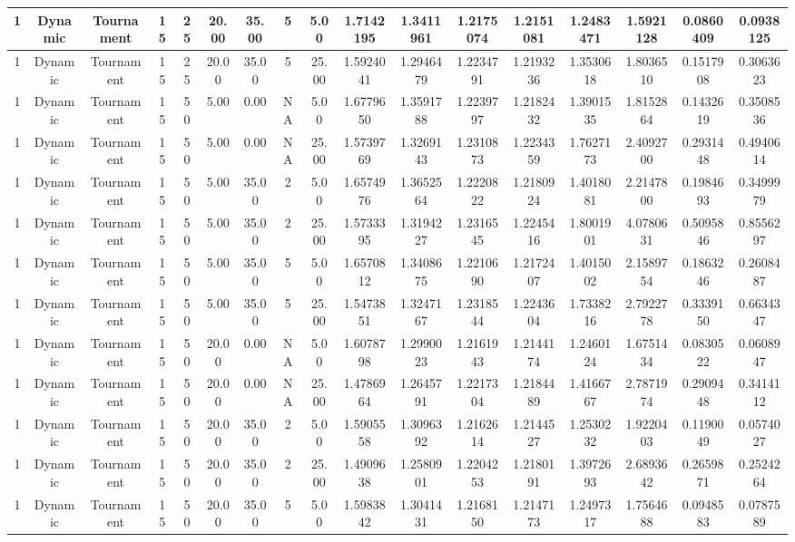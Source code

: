 \begin{longtable}{ | c | c | c | c | c | c | c | c | c | c | c | c | c | c | c | c | c | }
	\hline
	1	&	Dynamic	&	Tournament	&	15	&	25	&	20.00	&	35.00	&	5	&	5.00	&	1.7142195	&	1.3411961	&	1.2175074	&	1.2151081	&	1.2483471	&	1.5921128	&	0.0860409	&	0.0938125 \\
	\hline
	1	&	Dynamic	&	Tournament	&	15	&	25	&	20.00	&	35.00	&	5	&	25.00	&	1.5924041	&	1.2946479	&	1.2234791	&	1.2193236	&	1.3530618	&	1.8036510	&	0.1517908	&	0.3063623 \\
	\hline
	1	&	Dynamic	&	Tournament	&	15	&	50	&	5.00	&	0.00	&	NA	&	5.00	&	1.6779650	&	1.3591788	&	1.2239797	&	1.2182432	&	1.3901535	&	1.8152864	&	0.1432619	&	0.3508536 \\
	\hline
	1	&	Dynamic	&	Tournament	&	15	&	50	&	5.00	&	0.00	&	NA	&	25.00	&	1.5739769	&	1.3269143	&	1.2310873	&	1.2234359	&	1.7627173	&	2.4092700	&	0.2931448	&	0.4940614 \\
	\hline
	1	&	Dynamic	&	Tournament	&	15	&	50	&	5.00	&	35.00	&	2	&	5.00	&	1.6574976	&	1.3652564	&	1.2220822	&	1.2180924	&	1.4018081	&	2.2147800	&	0.1984693	&	0.3499979 \\
	\hline
	1	&	Dynamic	&	Tournament	&	15	&	50	&	5.00	&	35.00	&	2	&	25.00	&	1.5733395	&	1.3194227	&	1.2316545	&	1.2245416	&	1.8001901	&	4.0780631	&	0.5095846	&	0.8556297 \\
	\hline
	1	&	Dynamic	&	Tournament	&	15	&	50	&	5.00	&	35.00	&	5	&	5.00	&	1.6570812	&	1.3408675	&	1.2210690	&	1.2172407	&	1.4015002	&	2.1589754	&	0.1863246	&	0.2608487 \\
	\hline
	1	&	Dynamic	&	Tournament	&	15	&	50	&	5.00	&	35.00	&	5	&	25.00	&	1.5473851	&	1.3247167	&	1.2318544	&	1.2243604	&	1.7338216	&	2.7922778	&	0.3339150	&	0.6634347 \\
	\hline
	1	&	Dynamic	&	Tournament	&	15	&	50	&	20.00	&	0.00	&	NA	&	5.00	&	1.6078798	&	1.2990023	&	1.2161943	&	1.2144174	&	1.2460124	&	1.6751434	&	0.0830522	&	0.0608947 \\
	\hline
	1	&	Dynamic	&	Tournament	&	15	&	50	&	20.00	&	0.00	&	NA	&	25.00	&	1.4786964	&	1.2645791	&	1.2217304	&	1.2184489	&	1.4166767	&	2.7871974	&	0.2909448	&	0.3414112 \\
	\hline
	1	&	Dynamic	&	Tournament	&	15	&	50	&	20.00	&	35.00	&	2	&	5.00	&	1.5905558	&	1.3096392	&	1.2162614	&	1.2144527	&	1.2530232	&	1.9220403	&	0.1190049	&	0.0574027 \\
	\hline
	1	&	Dynamic	&	Tournament	&	15	&	50	&	20.00	&	35.00	&	2	&	25.00	&	1.4909638	&	1.2580901	&	1.2204253	&	1.2180191	&	1.3972693	&	2.6893642	&	0.2659871	&	0.2524264 \\
	\hline
	1	&	Dynamic	&	Tournament	&	15	&	50	&	20.00	&	35.00	&	5	&	5.00	&	1.5983842	&	1.3041431	&	1.2168150	&	1.2147173	&	1.2497317	&	1.7564688	&	0.0948583	&	0.0787589 \\

\end{longtable}
